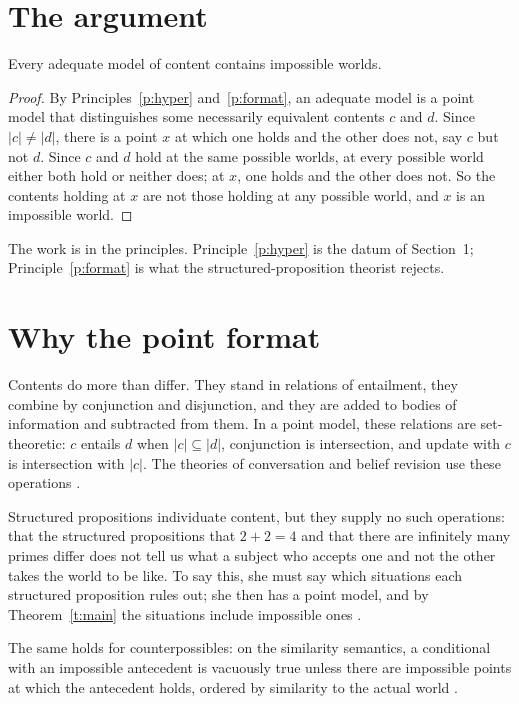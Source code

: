 \documentclass{situationist-preprint}
\begin{document}
\section{The argument}

\begin{theorem}\label{t:main}
Every adequate model of content contains impossible worlds.
\end{theorem}

\begin{proof}
By Principles~\ref{p:hyper} and~\ref{p:format}, an adequate model is a point model that distinguishes some necessarily equivalent contents $c$ and $d$. Since $|c|\ne|d|$, there is a point $x$ at which one holds and the other does not, say $c$ but not $d$. Since $c$ and $d$ hold at the same possible worlds, at every possible world either both hold or neither does; at $x$, one holds and the other does not. So the contents holding at $x$ are not those holding at any possible world, and $x$ is an impossible world.
\end{proof}

The work is in the principles. Principle~\ref{p:hyper} is the datum of Section~1; Principle~\ref{p:format} is what the structured-proposition theorist rejects.

\section{Why the point format}

Contents do more than differ. They stand in relations of entailment, they combine by conjunction and disjunction, and they are added to bodies of information and subtracted from them. In a point model, these relations are set-theoretic: $c$ entails $d$ when $|c|\subseteq|d|$, conjunction is intersection, and update with $c$ is intersection with $|c|$. The theories of conversation and belief revision use these operations \citep{Stalnaker1984}.

Structured propositions individuate content, but they supply no such operations: that the structured propositions that $2+2=4$ and that there are infinitely many primes differ does not tell us what a subject who accepts one and not the other takes the world to be like. To say this, she must say which situations each structured proposition rules out; she then has a point model, and by Theorem~\ref{t:main} the situations include impossible ones \citep{Jago2014,BertoJago2019}.

The same holds for counterpossibles: on the similarity semantics, a conditional with an impossible antecedent is vacuously true unless there are impossible points at which the antecedent holds, ordered by similarity to the actual world \citep{Nolan1997}.
\end{document}

